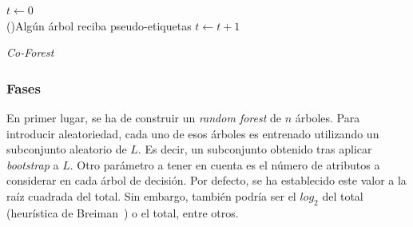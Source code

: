 \begin{itemize}
\begin{algorithm}
	\BlankLine

	$t \leftarrow 0$\\
	\While(){Algún árbol reciba pseudo-etiquetas}{
	$t \leftarrow t + 1$\\
	
}

	\caption{\textit{Co-Forest}}\label{alg:co-forest}
	\end{algorithm}

\subsubsection{Fases}

En primer lugar, se ha de construir un \textit{random forest} de $n$ árboles. Para introducir aleatoriedad, cada uno de esos árboles es entrenado utilizando un subconjunto aleatorio de $L$. Es decir, un subconjunto obtenido tras aplicar \textit{bootstrap} a $L$.
Otro parámetro a tener en cuenta es el número de atributos a considerar en cada árbol de decisión. Por defecto, se ha establecido este valor a la raíz cuadrada del total. Sin embargo, también podría ser el $log_{2}$ del total (heurística de Breiman~\cite{engelen2018thesis}) o el total, entre otros.


\end{itemize}
